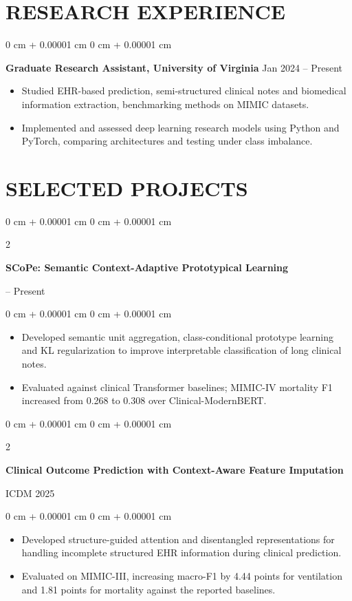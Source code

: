 \documentclass[10pt, letterpaper]{article}
\newenvironment{highlights}{
    \begin{itemize}[
        topsep=0.03 cm,
        parsep=0.03 cm,
        partopsep=0pt,
        itemsep=0pt,
        leftmargin=0 cm + 10pt
    ]
}{
    \end{itemize}
} %
\newenvironment{onecolentry}{
    \begin{adjustwidth}{
        0 cm + 0.00001 cm
    }{
        0 cm + 0.00001 cm
    }
}{
    \end{adjustwidth}
} %
\newenvironment{twocolentry}[2][]{
    \onecolentry
    \def\secondColumn{#2}
    \setcolumnwidth{\fill, 4.5 cm}
    \begin{paracol}{2}
}{
    \switchcolumn \raggedleft \secondColumn
    \end{paracol}
    \endonecolentry
} %
\begin{document}
\section{RESEARCH EXPERIENCE}
\begin{onecolentry}
\textbf{Graduate Research Assistant, University of Virginia} \hfill Jan 2024 -- Present
\begin{highlights}
\item Studied EHR-based prediction, semi-structured clinical notes and biomedical information extraction, benchmarking methods on MIMIC datasets.
\item Implemented and assessed deep learning research models using Python and PyTorch, comparing architectures and testing under class imbalance.
\end{highlights}
\end{onecolentry}
\section{SELECTED PROJECTS}
\begin{twocolentry}{2026 -- Present}
\textbf{SCoPe: Semantic Context-Adaptive Prototypical Learning}
\end{twocolentry}
\begin{onecolentry}
\begin{highlights}
\item Developed semantic unit aggregation, class-conditional prototype learning and KL regularization to improve interpretable classification of long clinical notes.
\item Evaluated against clinical Transformer baselines; MIMIC-IV mortality F1 increased from 0.268 to 0.308 over Clinical-ModernBERT.
\end{highlights}
\end{onecolentry}
\vspace{0.035 cm}

\begin{twocolentry}{ICDM 2025}
\textbf{Clinical Outcome Prediction with Context-Aware Feature Imputation}
\end{twocolentry}
\begin{onecolentry}
\begin{highlights}
\item Developed structure-guided attention and disentangled representations for handling incomplete structured EHR information during clinical prediction.
\item Evaluated on MIMIC-III, increasing macro-F1 by 4.44 points for ventilation and 1.81 points for mortality against the reported baselines.
\end{highlights}
\end{onecolentry}
\vspace{0.035 cm}
\end{document}
